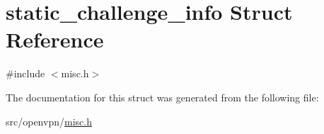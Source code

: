 \hypertarget{structstatic__challenge__info}{}\section{static\+\_\+challenge\+\_\+info Struct Reference}
\label{structstatic__challenge__info}


{\ttfamily \#include $<$misc.\+h$>$}



The documentation for this struct was generated from the following file\+:\begin{DoxyCompactItemize}
\item 
src/openvpn/\hyperlink{misc_8h}{misc.\+h}\end{DoxyCompactItemize}
